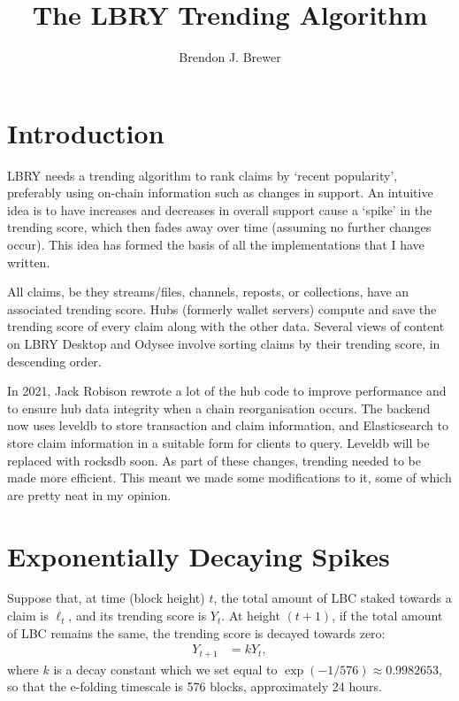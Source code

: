 \documentclass[a4paper, 12pt]{article}
\title{The LBRY Trending Algorithm}
\author{Brendon J. Brewer}
\date{}
\begin{document}
\maketitle


\setlength{\parindent}{0pt}
\setlength{\parskip}{8pt}

\section{Introduction}
LBRY \citep{li2020lbry} needs a trending algorithm to rank claims by `recent popularity',
preferably using on-chain information such as changes in support. An
intuitive idea is to have increases and decreases in overall support cause
a `spike' in the trending score, which then fades away over time
(assuming no further changes occur). This idea has formed the basis of all the
implementations that I have written.

All claims, be they streams/files, channels, reposts, or collections, have
an associated trending score. Hubs (formerly wallet servers) compute and
save the trending score of every claim along with the other data. Several
views of content on LBRY Desktop and Odysee involve sorting claims by their
trending score, in descending order.

In 2021, Jack Robison rewrote a lot of the hub code to improve performance
and to ensure hub data integrity when a chain reorganisation occurs. The
backend now uses leveldb to store transaction and claim information, and
Elasticsearch to store claim information in a suitable form for clients to
query. Leveldb will be replaced with rocksdb soon.
As part of these changes, trending needed to be made more efficient. This
meant we made some modifications to it, some of which are pretty neat
in my opinion.

\section{Exponentially Decaying Spikes}
Suppose that, at time (block height) $t$, the total amount of LBC staked
towards a claim is $\ell_t$, and its trending score is $Y_t$. At height
$(t+1)$, if the total amount of LBC remains the same, the trending score
is decayed towards zero:
\begin{align}
Y_{t+1} &= kY_t, \label{eqn:decay}
\end{align}
where $k$ is a decay constant which we set equal to
$\exp(-1/576) \approx 0.9982653$, so that the e-folding timescale is 576
blocks, approximately 24 hours.
\end{document}

